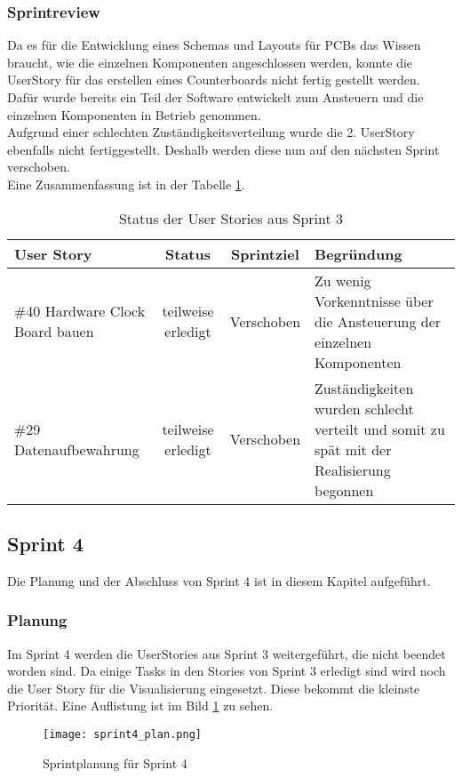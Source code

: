 \subsubsection*{Sprintreview}
Da es für die Entwicklung eines Schemas und Layouts für PCBs das Wissen braucht, wie die einzelnen Komponenten angeschlossen werden, konnte die UserStory für das erstellen eines Counterboards nicht fertig gestellt werden. Dafür wurde bereits ein Teil der Software entwickelt zum Ansteuern und die einzelnen Komponenten in Betrieb genommen.\\
Aufgrund einer schlechten Zuständigkeitsverteilung wurde die 2. UserStory ebenfalls nicht fertiggestellt. Deshalb werden diese nun auf den nächsten Sprint verschoben.\\
Eine Zusammenfassung ist in der Tabelle \ref{tab:sprint3}.
\begin{table}[H]
    \centering
    \begin{tabular}{p{4cm}ccp{7cm}}
        \textbf{User Story} &  \textbf{Status} & \textbf{Sprintziel}& \textbf{Begründung}\\\toprule[2pt]
        \#40 Hardware Clock Board bauen & teilweise erledigt & Verschoben & Zu wenig Vorkenntnisse über die Ansteuerung der einzelnen Komponenten\\
        \#29 Datenaufbewahrung & teilweise erledigt & Verschoben & Zuständigkeiten wurden schlecht verteilt und somit zu spät mit der Realisierung begonnen\\
    \end{tabular}
    \caption{Status der User Stories aus Sprint 3}
    \label{tab:sprint3}
\end{table}

\clearpage
\subsection*{Sprint 4}
Die Planung und der Abschluss von Sprint 4 ist in diesem Kapitel aufgeführt.
\subsubsection*{Planung}
Im Sprint 4 werden die UserStories aus Sprint 3 weitergeführt, die nicht beendet worden sind. Da einige Tasks in den Stories von Sprint 3 erledigt sind wird noch die User Story für die Visualisierung eingesetzt. Diese bekommt die kleinste Priorität. Eine Auflistung ist im Bild \ref{fig:sprint4} zu sehen.
\begin{figure}[H]
    \centering
    \texttt{[image: sprint4\_plan.png]}
    \caption{Sprintplanung für Sprint 4}
    \label{fig:sprint4}
\end{figure}

